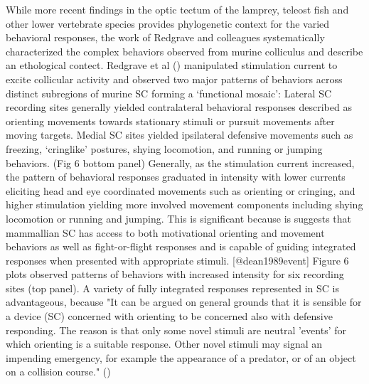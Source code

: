 \documentclass{ar-1col}
\begin{document}
{While more recent findings in the optic tectum of the lamprey, teleost fish and other lower vertebrate species provides phylogenetic context for the varied behavioral responses, the work of Redgrave and colleagues systematically characterized the complex behaviors observed from murine colliculus and describe an ethological contect. Redgrave et al (\cite{sahibzada1986movements}) manipulated stimulation current to excite collicular activity and observed two major patterns of behaviors across distinct subregions of murine SC forming a ‘functional mosaic’: Lateral SC recording sites generally yielded contralateral behavioral responses described as orienting movements towards stationary stimuli or pursuit movements after moving targets. Medial SC sites yielded ipsilateral defensive movements such as freezing, ‘cringlike’ postures, shying locomotion, and running or jumping behaviors. (Fig 6 bottom panel) Generally, as the stimulation current increased, the pattern of behavioral responses graduated in intensity with lower currents eliciting head and eye coordinated movements such as orienting or cringing, and higher stimulation yielding more involved movement components including shying locomotion or running and jumping. This is significant because is suggests that mammallian SC has access to both motivational orienting and movement behaviors as well as fight-or-flight responses and is capable of guiding integrated responses when presented with appropriate stimuli. [@dean1989event] Figure 6 plots observed patterns of behaviors with increased intensity for six recording sites (top panel). A variety of fully integrated responses represented in SC is advantageous, because "It can be argued on general grounds that it is sensible for a device (SC) concerned with orienting to be concerned also with defensive responding. The reason is that only some novel stimuli are neutral 'events' for which orienting is a suitable response. Other novel stimuli may signal an impending emergency, for example the appearance of a predator, or of an object on a collision course." (\cite{dean1989event})

}
\end{document}
